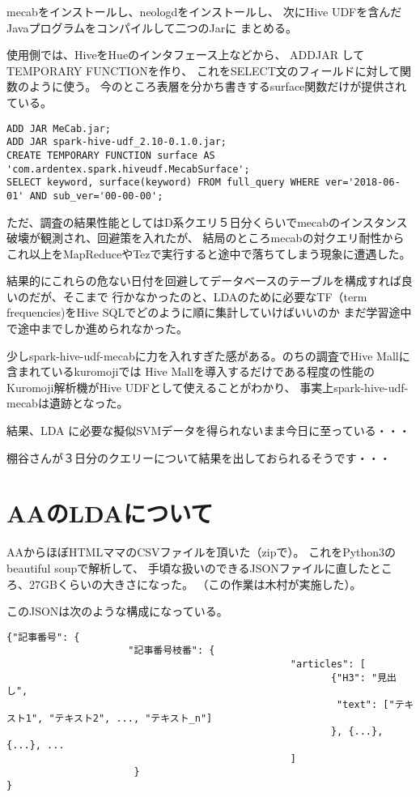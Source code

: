 \documentclass[uplatex]{jsarticle}
\begin{document}
mecabをインストールし、neologdをインストールし、
次にHive UDFを含んだJavaプログラムをコンパイルして二つのJarに
まとめる。

使用側では、HiveをHueのインタフェース上などから、
ADDJAR してTEMPORARY FUNCTIONを作り、
これをSELECT文のフィールドに対して関数のように使う。
今のところ表層を分かち書きするsurface関数だけが提供されている。

\begin{verbatim}
ADD JAR MeCab.jar;
ADD JAR spark-hive-udf_2.10-0.1.0.jar;
CREATE TEMPORARY FUNCTION surface AS 'com.ardentex.spark.hiveudf.MecabSurface';
SELECT keyword, surface(keyword) FROM full_query WHERE ver='2018-06-01' AND sub_ver='00-00-00';
\end{verbatim}

ただ、調査の結果性能としてはD系クエリ５日分くらいでmecabのインスタンス破壊が観測され、回避策を入れたが、
結局のところmecabの対クエリ耐性からこれ以上をMapReduceやTezで実行すると途中で落ちてしまう現象に遭遇した。

結果的にこれらの危ない日付を回避してデータベースのテーブルを構成すれば良いのだが、そこまで
行かなかったのと、LDAのために必要なTF（term frequencies)をHive SQLでどのように順に集計していけばいいのか
まだ学習途中で途中までしか進められなかった。

少しspark-hive-udf-mecabに力を入れすぎた感がある。のちの調査でHive Mallに含まれているkuromojiでは
Hive Mallを導入するだけである程度の性能のKuromoji解析機がHive UDFとして使えることがわかり、
事実上spark-hive-udf-mecabは遺跡となった。

結果、LDA に必要な擬似SVMデータを得られないまま今日に至っている・・・

棚谷さんが３日分のクエリーについて結果を出しておられるそうです・・・

\section{AAのLDAについて}
AAからほぼHTMLママのCSVファイルを頂いた（zipで）。
これをPython3のbeautiful soupで解析して、
手頃な扱いのできるJSONファイルに直したところ、27GBくらいの大きさになった。
（この作業は木村が実施した）。

このJSONは次のような構成になっている。
\begin{verbatim}
{"記事番号": {
                     "記事番号枝番": {
                                                 "articles": [
                                                        {"H3": "見出し",
                                                         "text": ["テキスト1", "テキスト2", ..., "テキスト_n"]
                                                        }, {...}, {...}, ...
                                                 ]
                      }
}
\end{verbatim}
\end{document}
